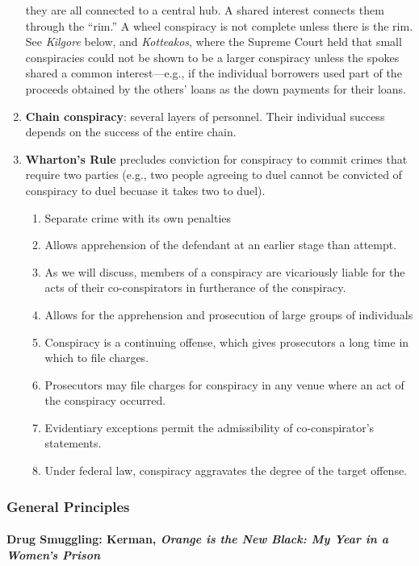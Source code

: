 \begin{enumerate}
    they are all connected to a central hub. A shared interest connects them 
    through the ``rim.'' A wheel conspiracy is not complete unless there is 
    the rim. See \emph{Kilgore} below, and \emph{Kotteakos}, where the Supreme 
    Court held that small conspiracies could not be shown to be a larger 
    conspiracy unless the spokes shared a common interest---e.g., if the 
    individual borrowers used part of the proceeds obtained by the others' 
    loans as the down payments for their loans.
    \item \textbf{Chain conspiracy}: several layers of personnel. Their 
    individual success depends on the success of the entire chain.
    \item \textbf{Wharton's Rule} precludes conviction for conspiracy to 
    commit crimes that require two parties (e.g., two people agreeing to duel 
    cannot be convicted of conspiracy to duel becuase it takes two to duel).
    \begin{enumerate}
        \item Separate crime with its own penalties
        \item Allows apprehension of the defendant at an earlier stage than 
        attempt.
        \item As we will discuss, members of a conspiracy are vicariously 
        liable for the acts of their co-conspirators in furtherance of the 
        conspiracy.
        \item Allows for the apprehension and prosecution of large groups of 
        individuals \item Conspiracy is a continuing offense, which gives 
        prosecutors a long time in which to file charges.
        \item Prosecutors may file charges for conspiracy in any venue where 
        an act of the conspiracy occurred.
        \item Evidentiary exceptions permit the admissibility of 
        co-conspirator's statements.
        \item Under federal law, conspiracy aggravates the degree of the 
        target offense.
    \end{enumerate}
\end{enumerate}

\subsubsection{General Principles}

\paragraph{Drug Smuggling: Kerman, \emph{Orange is the New Black: My Year in a 
Women's Prison}}

